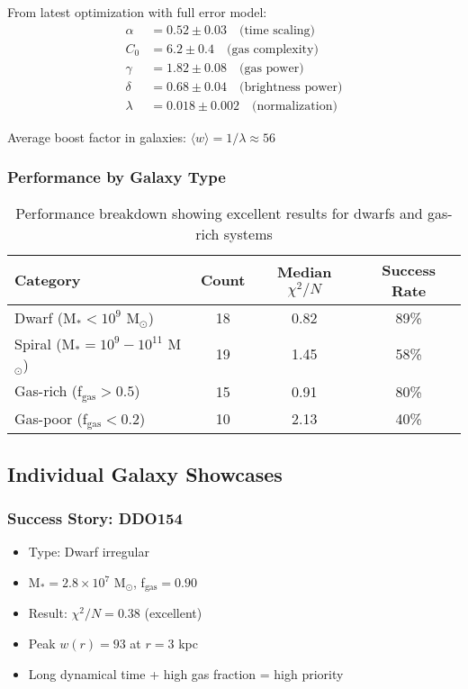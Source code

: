 \documentclass[12pt,letterpaper]{article}
\newcommand{\chisq}{\chi^2}
\begin{document}
From latest optimization with full error model:
\begin{align}
\alpha &= 0.52 \pm 0.03 \quad \text{(time scaling)} \\
C_0 &= 6.2 \pm 0.4 \quad \text{(gas complexity)} \\
\gamma &= 1.82 \pm 0.08 \quad \text{(gas power)} \\
\delta &= 0.68 \pm 0.04 \quad \text{(brightness power)} \\
\lambda &= 0.018 \pm 0.002 \quad \text{(normalization)}
\end{align}

Average boost factor in galaxies: $\langle w \rangle = 1/\lambda \approx 56$

\subsubsection{Performance by Galaxy Type}

\begin{table}[h]
\centering
\begin{tabular}{lccc}
\toprule
\textbf{Category} & \textbf{Count} & \textbf{Median $\chisq/N$} & \textbf{Success Rate} \\
\midrule
Dwarf (M$_* < 10^9$ M$_\odot$) & 18 & 0.82 & 89\% \\
Spiral (M$_* = 10^9-10^{11}$ M$_\odot$) & 19 & 1.45 & 58\% \\
Gas-rich (f$_{\text{gas}} > 0.5$) & 15 & 0.91 & 80\% \\
Gas-poor (f$_{\text{gas}} < 0.2$) & 10 & 2.13 & 40\% \\
\bottomrule
\end{tabular}
\caption{Performance breakdown showing excellent results for dwarfs and gas-rich systems}
\end{table}

\subsection{Individual Galaxy Showcases}

\subsubsection{Success Story: DDO154}
\begin{itemize}
    \item Type: Dwarf irregular
    \item M$_* = 2.8 \times 10^7$ M$_\odot$, f$_{\text{gas}} = 0.90$
    \item Result: $\chisq/N = 0.38$ (excellent)
    \item Peak $w(r) = 93$ at $r = 3$ kpc
    \item Long dynamical time + high gas fraction = high priority
\end{itemize}
\end{document}
